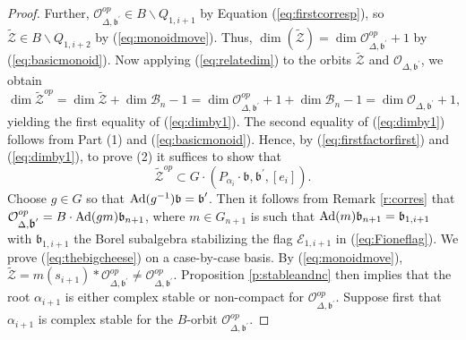 \documentclass[12pt]{amsart}
\numberwithin{equation}{section}
\newcommand{\cZ}{{\mathcal Z}}
\newcommand{\fb}{\mbox{${\mathfrak b}$}}
\newcommand{\Ad}{{\rm Ad}}
\newcommand{\B}{\mathcal{B}}
\newcommand{\F}{\mathcal{F}}
\begin{document}
\begin{proof}
  Further, $\mathcal{O}_{\Delta,{\fb}^{\prime}}^{op} \in B\backslash Q_{1,i+1}$ by Equation (\ref{eq:firstcorresp}), so $\tilde{\cZ} \in  B\backslash Q_{1,i+2}$ by (\ref{eq:monoidmove}).  Thus, $\dim(\tilde{\cZ})=\dim\mathcal{O}_{\Delta,{\fb}^{\prime}}^{op}+1$ by (\ref{eq:basicmonoid}).
Now applying (\ref{eq:relatedim}) to the orbits $\tilde{\cZ}$ and $\mathcal{O}_{\Delta,\fb^{\prime}}$, we obtain
$$
\dim \tilde{\cZ}^{op}=\dim\tilde{\cZ}+\dim\B_{n}-1=\dim\mathcal{O}_{\Delta,\fb^{\prime}}^{op}+1+\dim\B_{n}-1=\dim\mathcal{O}_{\Delta,\fb^{\prime}}+1, 
$$
yielding the first equality of (\ref{eq:dimby1}).  The second equality of (\ref{eq:dimby1}) follows from Part (1) and (\ref{eq:basicmonoid}).  Hence, by (\ref{eq:firstfactorfirst}) and (\ref{eq:dimby1}), to prove (2) it suffices to show that 
\begin{equation}\label{eq:thebigcheese}
\tilde{\cZ}^{op}\subset G\cdot (P_{\alpha_{i}}\cdot\fb, \fb^{\prime},[e_{i}]).
\end{equation}
Choose $g\in G$ so that $\Ad(g^{-1})\fb=\fb^{\prime}$.
Then it follows from Remark \ref{r:corres} that $\mathcal{O}_{\Delta,\fb^{\prime}}^{op}=B\cdot \Ad(gm)\fb_{n+1}$, where $m\in G_{n+1}$ is such that $\Ad(m)\fb_{n+1}=\fb_{1,i+1}$ with $\fb_{1,i+1}$ the Borel subalgebra stabilizing the flag $\mathcal{E}_{1,i+1}$ in (\ref{eq:Fioneflag}).  We prove (\ref{eq:thebigcheese}) on a case-by-case basis.  By (\ref{eq:monoidmove}), $\tilde{\cZ}=m(s_{i+1})*\mathcal{O}_{\Delta,\fb^{\prime}}^{op}\neq \mathcal{O}_{\Delta,\fb^{\prime}}^{op}$.   Proposition \ref{p:stableandnc} then implies that the root $\alpha_{i+1}$ is either complex stable or non-compact for $\mathcal{O}_{\Delta,\fb^{\prime}}^{op}$.  Suppose first that $\alpha_{i+1}$ is complex stable for the $B$-orbit $\mathcal{O}_{\Delta,\fb^{\prime}}^{op}$.  

\end{proof}
\end{document}
